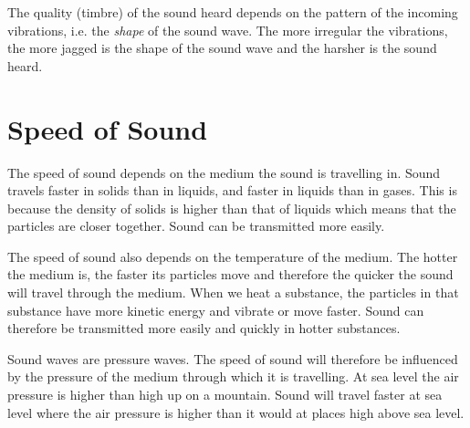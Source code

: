 The quality (timbre) of the sound heard depends on the pattern of the incoming vibrations, i.e.\@{} the \textit{shape} of the sound wave. The more irregular the vibrations, the more jagged is the shape of the sound wave and the harsher is the sound heard.

\section{Speed of Sound}
The speed of sound depends on the medium the sound is travelling in. Sound travels faster in solids than in liquids, and faster in liquids than in gases. This is because the density of solids is higher than that of liquids which means that the particles are closer together. Sound can be transmitted more easily.

The speed of sound also depends on the temperature of the medium. The hotter the medium is, the faster its particles move and therefore the quicker the sound will travel through the medium. When we heat a substance, the particles in that substance have more kinetic energy and vibrate or move faster. Sound can therefore be transmitted more easily and quickly in hotter substances.

Sound waves are pressure waves. The speed of sound will therefore be influenced by the pressure of the medium through which it is travelling. At sea level the air pressure is higher than high up on a mountain. Sound will travel faster at sea level where the air pressure is higher than it would at places high above sea level.

\\
